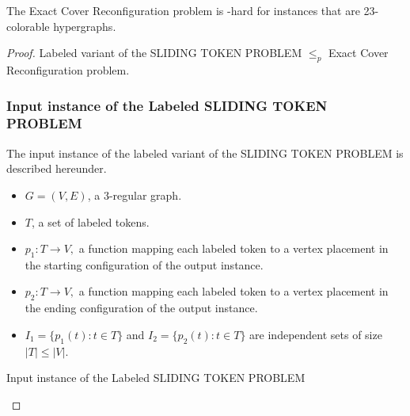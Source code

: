 \begin{lemma}The Exact Cover Reconfiguration problem is \PSPACE-hard for instances that are 23-colorable hypergraphs. \end{lemma}

\begin{proof}Labeled variant of the SLIDING TOKEN PROBLEM $\leq_p$ Exact Cover Reconfiguration problem.

\subsubsection{Input instance of the Labeled SLIDING TOKEN PROBLEM}
The input instance of the labeled variant of the SLIDING TOKEN PROBLEM is described hereunder.
\begin{itemize}
  \item $G = (V,E)$, a $3$-regular graph.
  \item $T$, a set of labeled tokens.
  \item $p_1 : T \rightarrow V,$ a function mapping each labeled token to a vertex placement in the starting configuration of the output instance.
  \item $p_2 : T \rightarrow V,$ a function mapping each labeled token to a vertex placement in the ending configuration of the output instance.
  \item $I_1 = \{p_1(t) : t \in T\}$ and $I_2 = \{p_2(t) : t \in T\}$ are independent sets of size $|T| \leq |V|$.
\end{itemize}

\begin{example}{Input instance of the Labeled SLIDING TOKEN PROBLEM}
  \begin{figure}[H]
    \begin{center}
      \begin{scaletikzpicturetowidth}{\textwidth}
        \begin{tikzpicture}[scale=1]


\end{tikzpicture}
\end{scaletikzpicturetowidth}
\end{center}
\end{figure}
\end{example}
\end{proof}
